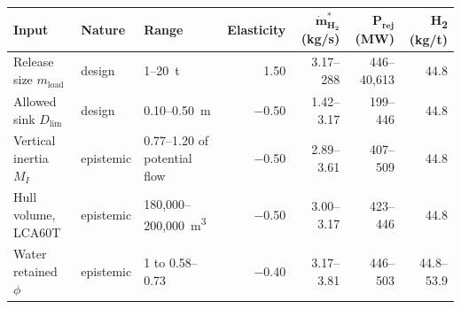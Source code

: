\begin{tabular}{@{} l l l r r r r @{}}
\toprule
\textbf{Input} & \textbf{Nature} & \textbf{Range} & \textbf{Elasticity} & $\boldsymbol{\dot m^*_{H_2}}$ \textbf{(kg/s)} & $\boldsymbol{P_\text{rej}}$ \textbf{(MW)} & \textbf{H\textsubscript{2} (kg/t)} \\
\midrule
Release size $m_\text{load}$ & design & 1--20~t & 1.50 & 3.17--288 & 446--40{,}613 & 44.8 \\
Allowed sink $D_\text{lim}$ & design & 0.10--0.50~m & $-$0.50 & 1.42--3.17 & 199--446 & 44.8 \\
Vertical inertia $M_I$ & epistemic & 0.77--1.20 of potential flow & $-$0.50 & 2.89--3.61 & 407--509 & 44.8 \\
Hull volume, LCA60T & epistemic & 180{,}000--200{,}000~m\textsuperscript{3} & $-$0.50 & 3.00--3.17 & 423--446 & 44.8 \\
Water retained $\phi$ & epistemic & 1 to 0.58--0.73 & $-$0.40 & 3.17--3.81 & 446--503 & 44.8--53.9 \\
\bottomrule
\end{tabular}
